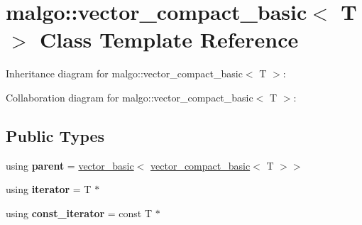 \hypertarget{classmalgo_1_1vector__compact__basic}{}\section{malgo\+:\+:vector\+\_\+compact\+\_\+basic$<$ T $>$ Class Template Reference}
\label{classmalgo_1_1vector__compact__basic}


Inheritance diagram for malgo\+:\+:vector\+\_\+compact\+\_\+basic$<$ T $>$\+:


Collaboration diagram for malgo\+:\+:vector\+\_\+compact\+\_\+basic$<$ T $>$\+:
\subsection*{Public Types}
\begin{DoxyCompactItemize}
\item 
using {\bfseries parent} = \hyperlink{classmalgo_1_1vector__basic}{vector\+\_\+basic}$<$ \hyperlink{classmalgo_1_1vector__compact__basic}{vector\+\_\+compact\+\_\+basic}$<$ T $>$$>$\hypertarget{classmalgo_1_1vector__compact__basic_a7e3536c1655069a477719b5fd0d15a0e}{}\label{classmalgo_1_1vector__compact__basic_a7e3536c1655069a477719b5fd0d15a0e}

\item 
using {\bfseries iterator} = T $\ast$\hypertarget{classmalgo_1_1vector__compact__basic_aecfd22d858fc59159bd958bf9e5fed10}{}\label{classmalgo_1_1vector__compact__basic_aecfd22d858fc59159bd958bf9e5fed10}

\item 
using {\bfseries const\+\_\+iterator} = const T $\ast$\hypertarget{classmalgo_1_1vector__compact__basic_a074900c0efedec86a3d3123fa849dcec}{}\label{classmalgo_1_1vector__compact__basic_a074900c0efedec86a3d3123fa849dcec}

\end{DoxyCompactItemize}
